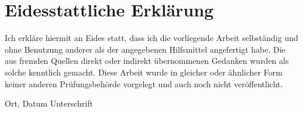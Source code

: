 \thispagestyle{empty}
\section*{Eidesstattliche Erklärung}

Ich erkläre hiermit an Eides statt, dass ich die vorliegende Arbeit selbständig und ohne Benutzung anderer als der angegebenen Hilfsmittel angefertigt habe. Die aus fremden Quellen direkt oder indirekt übernommenen Gedanken wurden als solche kenntlich gemacht. Diese Arbeit wurde in gleicher oder ähnlicher Form keiner anderen Prüfungsbehörde vorgelegt und auch noch nicht veröffentlicht.


\vspace{4cm}

\hspace{1.5cm} Ort, Datum \hfill Unterschrift \hspace{1.7cm}
